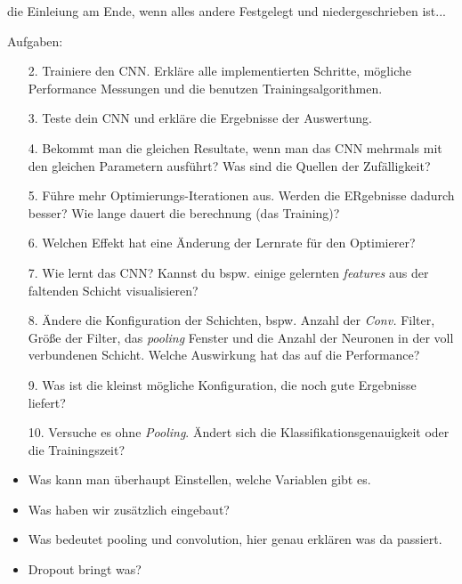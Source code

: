 \documentclass[10pt,journal,compsoc]{IEEEtran}
\begin{document}
\maketitle
\IEEEdisplaynontitleabstractindextext
\IEEEpeerreviewmaketitle
{}
 die Einleiung am Ende, wenn alles andere Festgelegt und niedergeschrieben ist...

{\Large Aufgaben:}
\begin{itemize}
\item [2.] Trainiere den CNN. Erkläre alle implementierten Schritte, mögliche Performance Messungen und die benutzen Trainingsalgorithmen.
\item [3.] Teste dein CNN und erkläre die Ergebnisse der Auswertung.
\item [4.] Bekommt man die gleichen Resultate, wenn man das CNN mehrmals mit den gleichen Parametern ausführt? Was sind die Quellen der Zufälligkeit?
\item [5.] Führe mehr Optimierungs-Iterationen aus. Werden die ERgebnisse dadurch besser? Wie lange dauert die berechnung (das Training)?
\item [6.] Welchen Effekt hat eine Änderung der Lernrate für den Optimierer?
\item [7.] Wie lernt das CNN? Kannst du bspw. einige gelernten \emph{features} aus der faltenden Schicht visualisieren?
\item [8.] Ändere die Konfiguration der Schichten, bspw. Anzahl der \emph{Conv.} Filter, Größe der Filter, das \emph{pooling} Fenster und die Anzahl der Neuronen in der voll verbundenen Schicht. Welche Auswirkung hat das auf die Performance?
\item [9.] Was ist die kleinst mögliche Konfiguration, die noch gute Ergebnisse liefert?
\item [10.] Versuche es ohne \emph{Pooling}. Ändert sich die Klassifikationsgenauigkeit oder die Trainingszeit?
\end{itemize}

\begin{itemize}
\item Was kann man überhaupt Einstellen, welche Variablen gibt es.
\item Was haben wir zusätzlich eingebaut?
\item Was bedeutet pooling und convolution, hier genau erklären was da passiert.
\item Dropout bringt was?
\end{itemize}
\end{document}
